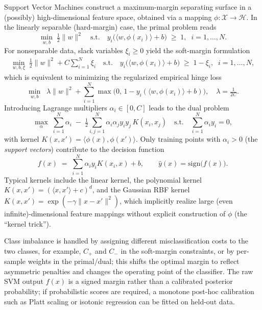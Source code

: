 Support Vector Machines construct a maximum-margin separating surface in a (possibly) high-dimensional feature space, obtained via a mapping $\phi:\mathcal{X}\to\mathcal{H}$. In the linearly separable (hard-margin) case, the primal problem reads
\begin{equation}
\min_{w,b}\;\tfrac12\lVert w\rVert^2
\quad\text{s.t.}\quad
y_i\bigl(\langle w,\phi(x_i)\rangle + b\bigr)\;\ge\;1,\;\; i=1,\dots,N.
\label{eq:svm-hard-margin}
\end{equation}
For nonseparable data, slack variables $\xi_i\ge 0$ yield the soft-margin formulation
\begin{equation}
\begin{aligned}
\min_{w,b,\xi}\;\tfrac12\lVert w\rVert^2 + C\sum_{i=1}^N\xi_i
\quad\text{s.t.}\quad
y_i\bigl(\langle w,\phi(x_i)\rangle + b\bigr)\;\ge\;1-\xi_i,\;\; i=1,\dots,N,
\end{aligned}
\label{eq:svm-soft-margin}
\end{equation}
which is equivalent to minimizing the regularized empirical hinge loss
\begin{equation}
\min_{w,b}\;\; \lambda \lVert w\rVert^2 + \sum_{i=1}^N \max\bigl(0,\,1 - y_i(\langle w,\phi(x_i)\rangle+b)\bigr),
\quad \lambda=\tfrac{1}{2C}.
\label{eq:svm-empirical-hinge}
\end{equation}
Introducing Lagrange multipliers $\alpha_i\in[0,C]$ leads to the dual problem
\begin{equation}
\max_{\alpha}\;\sum_{i=1}^N \alpha_i \;-\; \tfrac12\sum_{i,j=1}^N \alpha_i\alpha_j y_i y_j \,K(x_i,x_j)
\quad\text{s.t.}\quad \sum_{i=1}^N \alpha_i y_i = 0,
\label{eq:svm-dual}
\end{equation}
with kernel $K(x,x')=\langle \phi(x),\phi(x')\rangle$. Only training points with $\alpha_i>0$ (the \emph{support vectors}) contribute to the decision function
\begin{equation}
f(x) \;=\; \sum_{i=1}^N \alpha_i y_i K(x_i,x) + b,\qquad \hat{y}(x) = \mathrm{sign}\bigl(f(x)\bigr).
\label{eq:svm-decision-function}
\end{equation}
Typical kernels include the linear kernel, the polynomial kernel $K(x,x')={(\langle x,x'\rangle + c)}^d$, and the Gaussian RBF kernel $K(x,x')=\exp(-\gamma\lVert x-x'\rVert^2)$, which implicitly realize large (even infinite)-dimensional feature mappings without explicit construction of $\phi$ (the ``kernel trick'').

Class imbalance is handled by assigning different misclassification costs to the two classes, for example, $C_+$ and $C_-$ in the soft-margin constraints, or by per-sample weights in the primal/dual; this shifts the optimal margin to reflect asymmetric penalties and changes the operating point of the classifier. The raw SVM output $f(x)$ is a signed margin rather than a calibrated posterior probability; if probabilistic scores are required, a monotone post-hoc calibration such as Platt scaling or isotonic regression can be fitted on held-out data.

